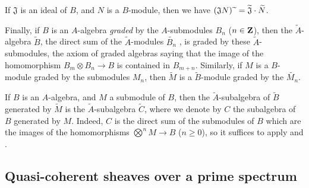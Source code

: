 \begin{env}[1.3.13]
If $\mathfrak{J}$ is an ideal of $B$, and $N$ is a $B$-module, then we have $(\mathfrak{J}N){\,\widetilde{\,}\,}=\widetilde{\mathfrak{J}}\cdot\widetilde{N}$.

Finally, if $B$ is an $A$-algebra \emph{graded} by the $A$-submodules $B_n$ ($n\in\mathbf{Z}$), then the $\widetilde{A}$-algebra $\widetilde{B}$, the direct sum of the $\widetilde{A}$-modules $\widetilde{B_n}$ , is graded by these $\widetilde{A}$-submodules, the axiom of graded algebras saying that the image of the homomorphism $B_m\otimes B_n\to B$ is contained in $B_{m+n}$.
Similarly, if $M$ is a $B$-module graded by the submodules $M_n$, then $\widetilde{M}$ is a $\widetilde{B}$-module graded by the $\widetilde{M_n}$.
\end{env}

\begin{env}[1.3.14]
\label{I.1.3.14}
If $B$ is an $A$-algebra, and $M$ a submodule of $B$, then the $\widetilde{A}$-subalgebra of $\widetilde{B}$ generated by $\widetilde{M}$  is the $\widetilde{A}$-subalgebra $\widetilde{C}$, where we denote by $C$ the subalgebra of $B$ generated by $M$.
Indeed, $C$ is the direct sum of the submodules of $B$ which are the images of the homomorphisms $\bigotimes^n M\to B$ ($n\geq 0$), so it suffices to apply  and .
\end{env}

\subsection{Quasi-coherent sheaves over a prime spectrum}
\label{subsection:I.1.4}

